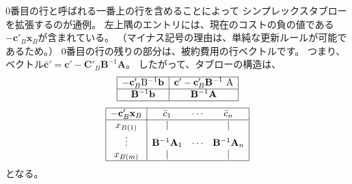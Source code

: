 \documentclass{jsarticle}
\begin{document}
0番目の行と呼ばれる一番上の行を含めることによって
シンプレックスタブローを拡張するのが通例。
左上隅のエントリには、現在のコストの負の値である
$-\bm{c}'_B\bm{x}_B$が含まれている。
（マイナス記号の理由は、単純な更新ルールが可能であるため。）
0番目の行の残りの部分は、被約費用の行ベクトルです。
つまり、ベクトル$\bar{\bm{c}}'=\bm{c}'-\bm{C}'_B\bm{B}^{-1}\bm{A}$。
したがって、タブローの構造は、
\begin{equation}
  \begin{array}{|c|c|}
  \hline-\mathbf{c}_{B}^{\prime} \mathrm{B}^{-1} \mathbf{b} & \mathbf{c}^{\prime}-\mathbf{c}_{B}^{\prime} \mathbf{B}^{-1} \mathrm{~A} \\
  \hline \mathbf{B}^{-1} \mathbf{b} & \mathbf{B}^{-1} \mathbf{A} \\
  \hline
  \end{array}
\end{equation}
\begin{equation}
  \begin{array}{|c|ccc|}
  \hline-\mathbf{c}_{B}^{\prime} \mathbf{x}_{B} & \bar{c}_{1} & \cdots & \bar{c}_{n} \\
  \hline x_{B(1)} & \mid & & \mid \\
  \vdots & \mathbf{B}^{-1} \mathbf{A}_{1} & \cdots & \mathbf{B}^{-1} \mathbf{A}_{n} \\
  x_{B(m)} & \mid & & \mid \\
  \hline
  \end{array}
\end{equation}
となる。
\end{document}
